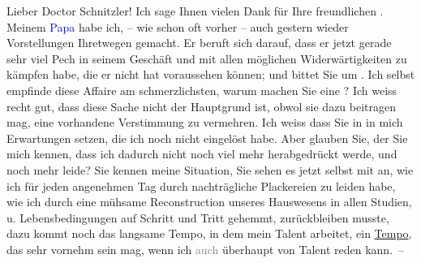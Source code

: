 \pstart
           Lieber Doctor Schnitzler! Ich sage Ihnen vielen Dank
               für Ihre freundlichen \label{K_L03132-1v}\label{K_L03132-1h}. Meinem \textcolor{blue}{Papa}{}\ledrightnote{{$\rightarrow$}\textcolor{blue}{Philipp Salzmann}} habe ich, – wie schon oft vorher – auch gestern wieder Vorstellungen Ihretwegen gemacht. Er
               beruft sich darauf, dass er jetzt gerade sehr viel Pech in seinem 
               Geschäft und mit allen möglichen
               Widerwärtigkeiten zu kämpfen habe, die er nicht hat voraussehen können; und bittet
               Sie um \label{K_L03132-2v}\label{K_L03132-2h}. Ich selbst {\pb}empfinde diese Affaire am
               schmerzlichsten, warum machen Sie eine \label{K_L03132-3v}\label{K_L03132-3h}? Ich
               weiss recht gut, dass diese Sache nicht der Hauptgrund ist, obwol sie dazu beitragen
               mag, eine vorhandene Verstimmung zu vermehren. Ich weiss dass Sie in \label{K_L03132-4v}\label{K_L03132-4h} in mich Erwartungen setzen, die ich noch nicht eingelöst habe. Aber glauben
               Sie, der Sie mich kennen, dass ich dadurch nicht noch viel mehr herabgedrückt werde,
               und noch mehr leide? Sie kennen meine Situation, Sie sehen es jetzt selbst mit an,
               wie ich für jeden ange{\pb}nehmen Tag durch nachträgliche Plackereien zu leiden habe, wie ich durch eine
               mühsame Reconstruction unseres Hauswesens in allen Studien, u. Lebensbedingungen auf
               Schritt und Tritt gehemmt, zurückbleiben musste, dazu kommt noch das langsame Tempo,
               in dem mein Talent arbeitet, ein \uline{Tempo}, das sehr
               vornehm sein mag, wenn ich \introOben{}\textcolor{gray}{auch}\introOben{} überhaupt von Talent reden kann. –\pend
           
